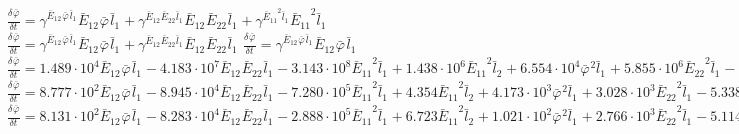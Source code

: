$\frac{{\delta}^{} {\bar{\varphi}}_{}}{{\delta} {{{t}}_{}}^{}} = {\gamma}^{{{{\bar{E}}_{12}}^{}{{\bar{\varphi}}_{}}^{}{{\bar{l}}_{1}}^{}}}{{{\bar{E}}_{12}}^{}{{\bar{\varphi}}_{}}^{}{{\bar{l}}_{1}}^{}} + {\gamma}^{{{{\bar{E}}_{12}}^{}{{\bar{E}}_{22}}^{}{{\bar{l}}_{1}}^{}}}{{{\bar{E}}_{12}}^{}{{\bar{E}}_{22}}^{}{{\bar{l}}_{1}}^{}} + {\gamma}^{{{{\bar{E}}_{11}}^{2}{{\bar{l}}_{1}}^{}}}{{{\bar{E}}_{11}}^{2}{{\bar{l}}_{1}}^{}}$
$\frac{{\delta}^{} {\bar{\varphi}}_{}}{{\delta} {{{t}}_{}}^{}} = {\gamma}^{{{{\bar{E}}_{12}}^{}{{\bar{\varphi}}_{}}^{}{{\bar{l}}_{1}}^{}}}{{{\bar{E}}_{12}}^{}{{\bar{\varphi}}_{}}^{}{{\bar{l}}_{1}}^{}} + {\gamma}^{{{{\bar{E}}_{12}}^{}{{\bar{E}}_{22}}^{}{{\bar{l}}_{1}}^{}}}{{{\bar{E}}_{12}}^{}{{\bar{E}}_{22}}^{}{{\bar{l}}_{1}}^{}}$
$\frac{{\delta}^{} {\bar{\varphi}}_{}}{{\delta} {{{t}}_{}}^{}} = {\gamma}^{{{{\bar{E}}_{12}}^{}{{\bar{\varphi}}_{}}^{}{{\bar{l}}_{1}}^{}}}{{{\bar{E}}_{12}}^{}{{\bar{\varphi}}_{}}^{}{{\bar{l}}_{1}}^{}}$
$\frac{{\delta}^{} {\bar{\varphi}}_{}}{{\delta} {{{t}}_{}}^{}} = 1.489\cdot 10^{4}{{{\bar{E}}_{12}}^{}{{\bar{\varphi}}_{}}^{}{{\bar{l}}_{1}}^{}} - 4.183\cdot 10^{7}{{{\bar{E}}_{12}}^{}{{\bar{E}}_{22}}^{}{{\bar{l}}_{1}}^{}} - 3.143\cdot 10^{8}{{{\bar{E}}_{11}}^{2}{{\bar{l}}_{1}}^{}} + 1.438\cdot 10^{6}{{{\bar{E}}_{11}}^{2}{{\bar{l}}_{2}}^{}} + 6.554\cdot 10^{4}{{{\bar{\varphi}}_{}}^{2}{{\bar{l}}_{1}}^{}} + 5.855\cdot 10^{6}{{{\bar{E}}_{22}}^{2}{{\bar{l}}_{1}}^{}} - 9.942\cdot 10^{7}{{{\bar{E}}_{11}}^{2}} - 8.836\cdot 10^{7}{{{\bar{\varphi}}_{}}^{}{{\bar{l}}_{1}}^{}} + 4.132\cdot 10^{6}{{{\bar{E}}_{11}}^{}{{\bar{l}}_{1}}^{}} + 1.537\cdot 10^{5}{{{\bar{E}}_{12}}^{}{{\bar{l}}_{1}}^{}}$
$\frac{{\delta}^{} {\bar{\varphi}}_{}}{{\delta} {{{t}}_{}}^{}} = 8.777\cdot 10^{2}{{{\bar{E}}_{12}}^{}{{\bar{\varphi}}_{}}^{}{{\bar{l}}_{1}}^{}} - 8.945\cdot 10^{4}{{{\bar{E}}_{12}}^{}{{\bar{E}}_{22}}^{}{{\bar{l}}_{1}}^{}} - 7.280\cdot 10^{5}{{{\bar{E}}_{11}}^{2}{{\bar{l}}_{1}}^{}} + 4.354{{{\bar{E}}_{11}}^{2}{{\bar{l}}_{2}}^{}} + 4.173\cdot 10^{3}{{{\bar{\varphi}}_{}}^{2}{{\bar{l}}_{1}}^{}} + 3.028\cdot 10^{3}{{{\bar{E}}_{22}}^{2}{{\bar{l}}_{1}}^{}} - 5.338\cdot 10^{2}{{{\bar{E}}_{11}}^{2}} - 8.039\cdot 10^{5}{{{\bar{\varphi}}_{}}^{}{{\bar{l}}_{1}}^{}} + 8.100\cdot 10^{3}{{{\bar{E}}_{11}}^{}{{\bar{l}}_{1}}^{}}$
$\frac{{\delta}^{} {\bar{\varphi}}_{}}{{\delta} {{{t}}_{}}^{}} = 8.131\cdot 10^{2}{{{\bar{E}}_{12}}^{}{{\bar{\varphi}}_{}}^{}{{\bar{l}}_{1}}^{}} - 8.283\cdot 10^{4}{{{\bar{E}}_{12}}^{}{{\bar{E}}_{22}}^{}{{\bar{l}}_{1}}^{}} - 2.888\cdot 10^{5}{{{\bar{E}}_{11}}^{2}{{\bar{l}}_{1}}^{}} + 6.723{{{\bar{E}}_{11}}^{2}{{\bar{l}}_{2}}^{}} + 1.021\cdot 10^{2}{{{\bar{\varphi}}_{}}^{2}{{\bar{l}}_{1}}^{}} + 2.766\cdot 10^{3}{{{\bar{E}}_{22}}^{2}{{\bar{l}}_{1}}^{}} - 5.114\cdot 10^{2}{{{\bar{E}}_{11}}^{2}} + 1.249{{{\bar{\varphi}}_{}}^{}{{\bar{l}}_{1}}^{}}$

